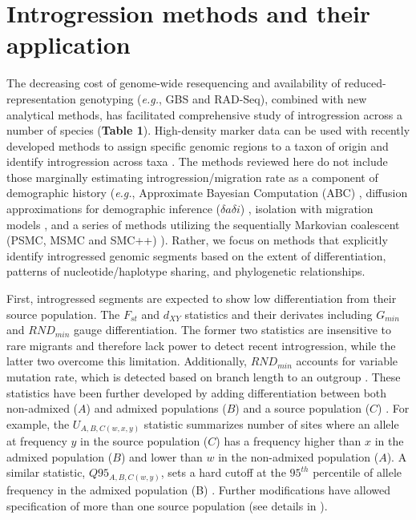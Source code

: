 \documentclass[11pt]{article}
\begin{document}
\section*{Introgression methods and their application}


The decreasing cost of genome-wide resequencing and availability of reduced-representation genotyping (\emph{e.g.}, GBS and RAD-Seq), combined with new analytical methods, has facilitated comprehensive study of introgression across a number of species (\textbf{Table 1}). 
High-density marker data can be used with recently developed methods to assign specific genomic regions to a taxon of origin and identify introgression across taxa \cite{martin2015,Price2009,Lawson2012,pease2015,rosenzweig2016,geneva2015}.
The methods reviewed here do not include those marginally estimating introgression\slash migration rate as a component of demographic history (\emph{e.g.}, Approximate Bayesian Computation (ABC) \cite{beaumont2002}, diffusion approximations for demographic inference ($\delta a\delta i$) \cite{gutenkunst2009}, isolation with migration models \cite{hey2004}, and a series of methods utilizing the sequentially Markovian coalescent (PSMC, MSMC and SMC++) \cite{li2011, schiffels2014, terhorst2017}). 
Rather, we focus on methods that explicitly identify introgressed genomic segments based on the extent of differentiation, patterns of nucleotide/haplotype sharing, and phylogenetic relationships.

First, introgressed segments are expected to show low differentiation from their source population.
The $F_{st}$ and $d_{XY}$ statistics and their derivates including $G_{min}$ \cite{geneva2015} and $RND_{min}$\cite{rosenzweig2016} gauge differentiation. 
The former two statistics are insensitive to rare migrants and therefore lack power to detect recent introgression, while the latter two overcome this limitation.
Additionally, $RND_{min}$ accounts for variable mutation rate, which is detected based on branch length to an outgroup \cite{rosenzweig2016}.
These statistics have been further developed by adding differentiation between both non-admixed ($A$) and admixed populations ($B$) and a source population ($C$) \cite{racimo2016}. 
For example, the $U_{A,B,C(w,x,y)}$ statistic summarizes number of sites where an allele at frequency $y$ in the source population ($C$) has a frequency higher than $x$ in the admixed population ($B$) and lower than $w$ in the non-admixed population ($A$).
A similar statistic, $Q95_{A,B,C(w,y)}$, sets a hard cutoff at the $95^{th}$ percentile of allele frequency in the admixed population (B) \cite{racimo2016}.
Further modifications have allowed specification of more than one source population (see details in \cite{racimo2016}).
 
\end{document}
